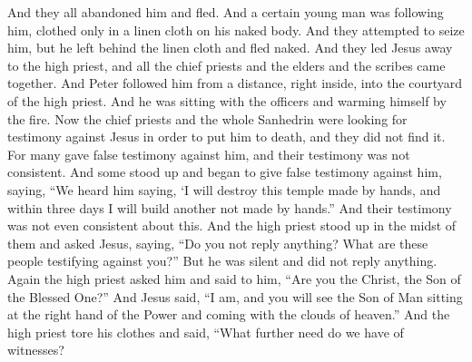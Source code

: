 \begin{biblechapter}
\verse And they all abandoned him and fled.
\verse And a certain young man was following him, clothed only in a linen cloth on his naked body. And they attempted to seize him,
\verse but he left behind the linen cloth and fled naked.
 And they led Jesus away to the high priest, and all the chief priests and the elders and the scribes came together.
\verse And Peter followed him from a distance, right inside, into the courtyard of the high priest. And he was sitting with the officers and warming himself by the fire.
\verse Now the chief priests and the whole Sanhedrin were looking for testimony against Jesus in order to put him to death, and they did not find it.
\verse For many gave false testimony against him, and their testimony was not consistent.
\verse And some stood up and began to give false testimony against him, saying,
\verse “We heard him saying, ‘I will destroy this temple made by hands, and within three days I will build another not made by hands.”
\verse And their testimony was not even consistent about this.
\verse And the high priest stood up in the midst of them and asked Jesus, saying, “Do you not reply anything? What are these people testifying against you?”
\verse But he was silent and did not reply anything. Again the high priest asked him and said to him, “Are you the Christ, the Son of the Blessed One?”
\verse And Jesus said, “I am, and you will see the Son of Man sitting at the right hand of the Power and coming with the clouds of heaven.”
\verse And the high priest tore his clothes and said, “What further need do we have of witnesses?

\end{biblechapter}
